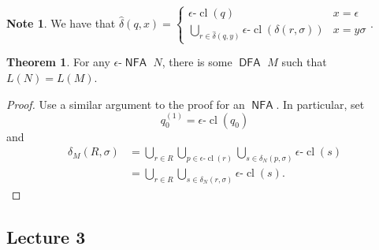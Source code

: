 \documentclass[10pt,letterpaper,cm]{nupset}
\theoremstyle{definition}
\newtheorem{note}[definition]{Note}
\theoremstyle{theorem}
\newtheorem{theorem}[definition]{Theorem}
\theoremstyle{remark}
\newcommand{\1}{\mathbf{1}}
\newcommand{\0}{\vec 0}
\DeclareMathOperator{\cl}{cl}
\DeclareMathOperator{\DFA}{\mathsf{DFA}}
\DeclareMathOperator{\NFA}{\mathsf{NFA}}
\begin{document}
\begin{note}
We have that $\hat{\delta}(q, x) = \begin{cases} \epsilon \text{-}\cl(q) & x = \epsilon
\\ \bigcup_{r\in \hat{\delta}(q, y)} \epsilon \text{-}\cl(\delta(r, \sigma)) & x = y\sigma 
\end{cases}.$
\end{note}

\begin{theorem}
For any $\epsilon$-$\NFA$ $N$, there is some $\DFA$ $M$ such that $L(N) = L(M)$.
\end{theorem}
\begin{proof}
Use a similar argument to the proof for an $\NFA$. In particular, set $$q_0^{(1)} = \epsilon \text{-}\cl(q_0)$$ and 
\begin{align*}
\delta_M(R, \sigma)  & =  \bigcup_{r\in R}\bigcup_{p\in \epsilon \text{-}\cl(r)} \bigcup_{s\in \delta_N(p, \sigma)} \epsilon \text{-}\cl(s)
\\ & = \bigcup_{r\in R} \bigcup_{s\in \delta_N(r, \sigma)} \epsilon \text{-}\cl(s)
.\end{align*}
\end{proof}

\subsection{Lecture 3}
\end{document}
